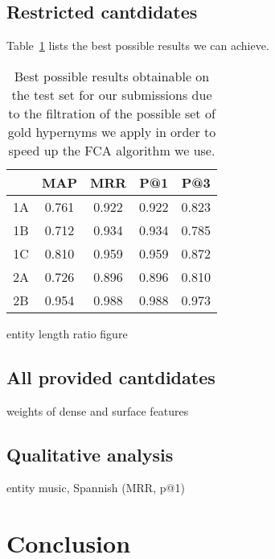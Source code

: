\documentclass[11pt,a4paper]{article}
\begin{document}
\subsection{Restricted cantdidates}

Table~\ref{table:upper} lists the best possible results we can achieve.

\begin{table}
	\centering
	\begin{tabular}{c|cccc}
		   & MAP & MRR & P@1  & P@3 \\ \hline
		1A & 0.761 & 0.922 & 0.922 & 0.823 \\
		1B & 0.712 & 0.934 & 0.934 & 0.785 \\
		1C & 0.810 & 0.959 & 0.959 & 0.872 \\
		2A & 0.726 & 0.896 & 0.896 & 0.810 \\
		2B & 0.954 & 0.988 & 0.988 & 0.973 \\
	\end{tabular}
	\label{table:upper}
	\caption{Best possible results obtainable on the test set for our
submissions due to the filtration of the possible set of gold hypernyms
we apply in order to speed up the FCA algorithm we use.}
\end{table}

entity length ratio figure %

\subsection{All provided cantdidates}

weights of dense and surface features %

\subsection{Qualitative analysis} %

entity music, Spannish (MRR, p@1)

\section{Conclusion}



\end{document}
